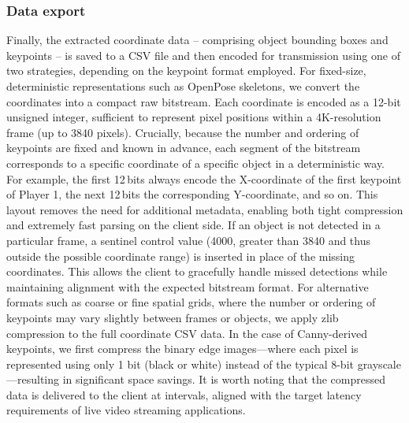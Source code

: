 \documentclass[manuscript, screen]{acmart}
\begin{document}
\subsubsection*{Data export}
Finally, the extracted coordinate data -- comprising object bounding boxes and keypoints -- is saved to a CSV file and then encoded for transmission using one of two strategies, depending on the keypoint format employed.
For fixed-size, deterministic representations such as OpenPose skeletons, we convert the coordinates into a compact raw bitstream. 
Each coordinate is encoded as a 12-bit unsigned integer, sufficient to represent pixel positions within a 4K-resolution frame (up to 3840 pixels). 
Crucially, because the number and ordering of keypoints are fixed and known in advance, each segment of the bitstream corresponds to a specific coordinate of a specific object in a deterministic way. 
For example, the first 12\,bits always encode the X-coordinate of the first keypoint of Player 1, the next 12\,bits the corresponding Y-coordinate, and so on. 
This layout removes the need for additional metadata, enabling both tight compression and extremely fast parsing on the client side. 
If an object is not detected in a particular frame, a sentinel control value (4000, greater than 3840 and thus outside the possible coordinate range) is inserted in place of the missing coordinates. 
This allows the client to gracefully handle missed detections while maintaining alignment with the expected bitstream format. 
For alternative formats such as coarse or fine spatial grids, where the number or ordering of keypoints may vary slightly between frames or objects, we apply zlib~\cite{gailly2004zlib} compression to the full coordinate CSV data. In the case of Canny-derived keypoints, we first compress the binary edge images—where each pixel is represented using only 1 bit (black or white) instead of the typical 8-bit grayscale—resulting in significant space savings. 
It is worth noting that the compressed data is delivered to the client at intervals, aligned with the target latency requirements of live video streaming applications.

\end{document}
